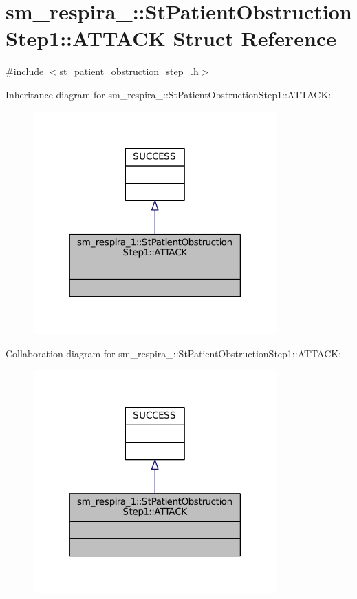\hypertarget{structsm__respira__1_1_1StPatientObstructionStep1_1_1ATTACK}{}\section{sm\+\_\+respira\+\_\+:\+:St\+Patient\+Obstruction\+Step1\+:\+:A\+T\+T\+A\+CK Struct Reference}
\label{structsm__respira__1_1_1StPatientObstructionStep1_1_1ATTACK}


{\ttfamily \#include $<$st\+\_\+patient\+\_\+obstruction\+\_\+step\+\_.\+h$>$}



Inheritance diagram for sm\+\_\+respira\+\_\+:\+:St\+Patient\+Obstruction\+Step1\+:\+:A\+T\+T\+A\+CK\+:
\nopagebreak
\begin{figure}[H]
\begin{center}
\leavevmode
\includegraphics[width=266pt]{structsm__respira__1_1_1StPatientObstructionStep1_1_1ATTACK__inherit__graph}
\end{center}
\end{figure}


Collaboration diagram for sm\+\_\+respira\+\_\+:\+:St\+Patient\+Obstruction\+Step1\+:\+:A\+T\+T\+A\+CK\+:
\nopagebreak
\begin{figure}[H]
\begin{center}
\leavevmode
\includegraphics[width=266pt]{structsm__respira__1_1_1StPatientObstructionStep1_1_1ATTACK__coll__graph}
\end{center}
\end{figure}


